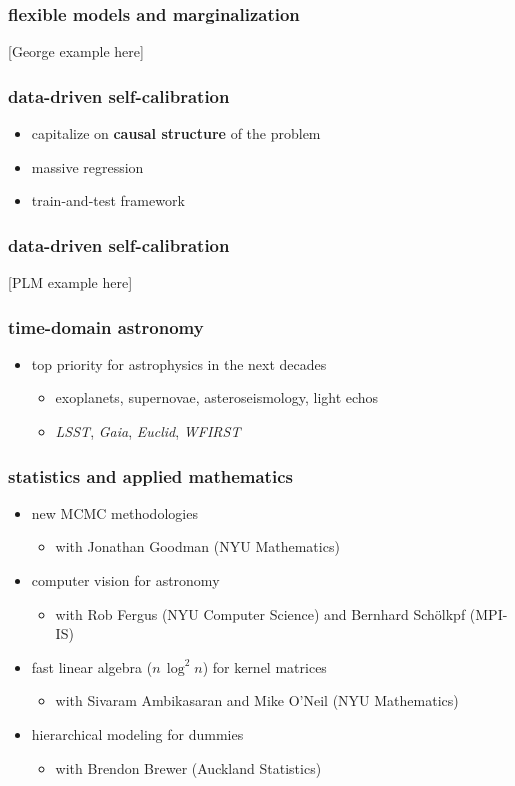 \documentclass{beamer}
\renewcommand{\emph}[1]{\textbf{#1}}
\newcommand{\project}[1]{\textsl{#1}}
\begin{document}
\begin{frame}
  \frametitle{flexible models and marginalization}
  [George example here]
\end{frame}

\begin{frame}
  \frametitle{data-driven self-calibration}
  \begin{itemize}
  \item capitalize on \emph{causal structure} of the problem
  \item massive regression
  \item train-and-test framework
  \end{itemize}
\end{frame}

\begin{frame}
  \frametitle{data-driven self-calibration}
  [PLM example here]
\end{frame}

\begin{frame}
  \frametitle{time-domain astronomy}
  \begin{itemize}
  \item top priority for astrophysics in the next decades
    \begin{itemize}
    \item exoplanets, supernovae, asteroseismology, light echos
    \item \project{LSST}, \project{Gaia}, \project{Euclid}, \project{WFIRST}
    \end{itemize}
  \end{itemize}
\end{frame}

\begin{frame}
  \frametitle{statistics and applied mathematics}
  \begin{itemize}
  \item new MCMC methodologies
    \begin{itemize}
    \item with Jonathan Goodman (NYU Mathematics)
    \end{itemize}
  \item computer vision for astronomy
    \begin{itemize}
    \item with Rob Fergus (NYU Computer Science) and Bernhard Sch\"olkpf (MPI-IS)
    \end{itemize}
  \item fast linear algebra ($n\,\log^2n$) for kernel matrices
    \begin{itemize}
    \item with Sivaram Ambikasaran and Mike O'Neil (NYU Mathematics)
    \end{itemize}
  \item hierarchical modeling for dummies
    \begin{itemize}
    \item with Brendon Brewer (Auckland Statistics)
    \end{itemize}
  \end{itemize}
\end{frame}
\end{document}

